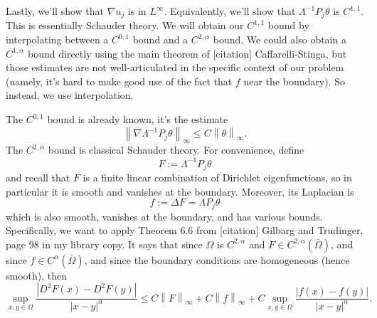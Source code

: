 \documentclass[11pt]{amsart}
\theoremstyle{remark}
\theoremstyle{definition}
\newcommand{\norm}[1]{\left\lVert#1\right\rVert}
\newcommand{\abs}[1]{\left\lvert #1 \right\rvert}
\newcommand{\grad}{\nabla}
\newcommand{\Laplace}{\Delta}
\begin{document}
Lastly, we'll show that $\grad u_j$ is in $L^\infty$.  Equivalently, we'll show that $\Lambda^{-1} P_j \theta$ is $C^{1,1}$.  This is essentially Schauder theory.  We will obtain our $C^{1,1}$ bound by interpolating between a $C^{0,1}$ bound and a $C^{2,\alpha}$ bound.  We could also obtain a $C^{1,\alpha}$ bound directly using the main theorem of [citation] Caffarelli-Stinga, but those estimates are not well-articulated in the specific context of our problem (namely, it's hard to make good use of the fact that $f$ near the boundary).  So instead, we use interpolation.  

The $C^{0,1}$ bound is already known, it's the estimate
\[ \norm{\grad \Lambda^{-1} P_j \theta}_\infty \leq C \norm{\theta}_\infty. \]
The $C^{2,\alpha}$ bound is classical Schauder theory.  For convenience, define 
\[ F := \Lambda^{-1} P_j \theta \]
and recall that $F$ is a finite linear combination of Dirichlet eigenfunctions, so in particular it is smooth and vanishes at the boundary.  Moreover, its Laplacian is 
\[ f := \Laplace F = \Lambda P_j \theta \]
which is also smooth, vanishes at the boundary, and has various bounds.  Specifically, we want to apply Theorem 6.6 from [citation] Gilbarg and Trudinger, page 98 in my library copy.  It says that since $\Omega$ is $C^{2,\alpha}$ and $F \in C^{2,\alpha}(\bar{\Omega})$, and since $f \in C^\alpha(\bar{\Omega})$, and since the boundary conditions are homogeneous (hence smooth), then
\[ \sup_{x,y \in \Omega} \frac{\abs{D^2 F(x)- D^2 F(y)}}{|x-y|^\alpha} \leq C \norm{F}_\infty + C \norm{f}_\infty + C \sup_{x,y\in\Omega} \frac{\abs{f(x)-f(y)}}{|x-y|^\alpha}. \]
\end{document}
